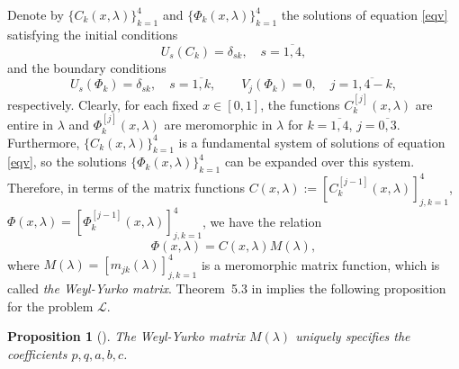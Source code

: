 \documentclass[a4paper,12pt]{article}
\newcommand{\de}{\delta}
\newcommand{\la}{\lambda}
\theoremstyle{plain}
\numberwithin{equation}{section}
\newtheorem{prop}[thm]{Proposition}
\theoremstyle{definition}
\theoremstyle{remark}
\begin{document}
Denote by $\{ C_k(x, \la) \}_{k = 1}^4$ and $\{ \Phi_k(x, \la) \}_{k = 1}^4$ the solutions of equation \eqref{eqv} satisfying the initial conditions
\begin{equation} \label{initC}
U_s(C_k) = \de_{sk}, \quad s = \overline{1,4}, 
\end{equation}
and the boundary conditions
\begin{equation} \label{bcPhi}
U_s(\Phi_k) = \de_{sk}, \quad s = \overline{1,k}, \qquad 
V_j(\Phi_k) = 0, \quad j = \overline{1,4-k},
\end{equation}
respectively. Clearly, for each fixed $x \in [0,1]$, the functions $C_k^{[j]}(x, \la)$ are entire in $\la$ and $\Phi_k^{[j]}(x, \la)$ are meromorphic in $\la$ for $k = \overline{1,4}$, $j = \overline{0,3}$. Furthermore, $\{ C_k(x, \la) \}_{k = 1}^4$ is a fundamental system of solutions of equation \eqref{eqv}, so the solutions $\{ \Phi_k(x, \la) \}_{k = 1}^4$ can be expanded over this system. Therefore, in terms of the matrix functions $C(x, \la) := [C_k^{[j-1]}(x, \la)]_{j,k = 1}^4$, $\Phi(x, \la) = [\Phi_k^{[j-1]}(x, \la)]_{j,k = 1}^4$, we have the relation
\begin{equation} \label{relM}
\Phi(x, \la) = C(x, \la) M(\la),
\end{equation}
where $M(\la) = [m_{jk}(\la)]_{j,k = 1}^4$ is a meromorphic matrix function, which is called \textit{the Weyl-Yurko matrix}. Theorem~5.3 in \cite{Bond23-mmas} implies the following proposition for the problem $\mathcal L$.

\begin{prop}[\cite{Bond23-mmas}] \label{prop:uniqM}
The Weyl-Yurko matrix $M(\la)$ uniquely specifies the coefficients $p, q, a, b, c$.
\end{prop}
\end{document}
